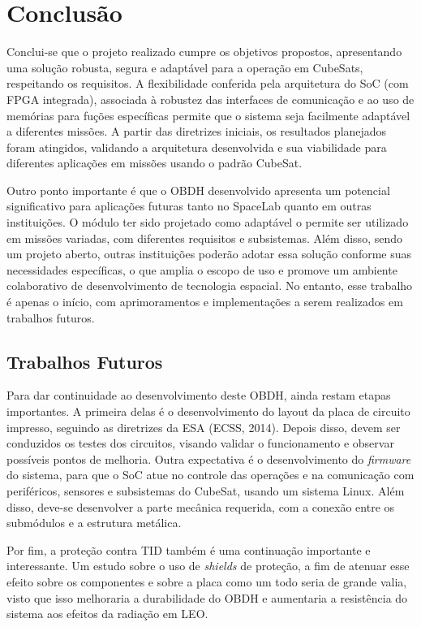 \chapter{Conclusão}

Conclui-se que o projeto realizado cumpre os objetivos propostos, apresentando uma solução robusta, segura e adaptável para a operação em CubeSats, respeitando os requisitos. A flexibilidade conferida pela arquitetura do SoC (com FPGA integrada), associada à robustez das interfaces de comunicação e ao uso de memórias para fuções específicas permite que o sistema seja facilmente adaptável a diferentes missões. A partir das diretrizes iniciais, os resultados planejados foram atingidos, validando a arquitetura desenvolvida e sua viabilidade para diferentes aplicações em missões usando o padrão CubeSat. 

Outro ponto importante é que o OBDH desenvolvido apresenta um potencial significativo para aplicações futuras tanto no SpaceLab quanto em outras instituições. O módulo ter sido projetado como adaptável o permite ser utilizado em missões variadas, com diferentes requisitos e subsistemas. Além disso, sendo um projeto aberto, outras instituições poderão adotar essa solução conforme suas necessidades específicas, o que amplia o escopo de uso e promove um ambiente colaborativo de desenvolvimento de tecnologia espacial. No entanto, esse trabalho é apenas o início, com aprimoramentos e implementações a serem realizados em trabalhos futuros.

\section{Trabalhos Futuros}

Para dar continuidade ao desenvolvimento deste OBDH, ainda restam etapas importantes. A primeira delas é o desenvolvimento do layout da placa de circuito impresso, seguindo as diretrizes da ESA (ECSS, 2014). Depois disso, devem ser conduzidos os testes dos circuitos, visando validar o funcionamento e observar possíveis pontos de melhoria. Outra expectativa é o desenvolvimento do \textit{firmware} do sistema, para que o SoC atue no controle das operações e na comunicação com periféricos, sensores e subsistemas do CubeSat, usando um sistema Linux. Além disso, deve-se desenvolver a parte mecânica requerida, com a conexão entre os submódulos e a estrutura metálica.

Por fim, a proteção contra TID também é uma continuação importante e interessante. Um estudo sobre o uso de \textit{shields} de proteção, a fim de atenuar esse efeito sobre os componentes e sobre a placa como um todo seria de grande valia, visto que isso melhoraria a durabilidade do OBDH e aumentaria a resistência do sistema aos efeitos da radiação em LEO.
